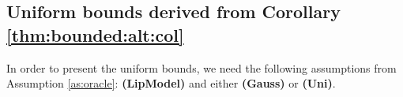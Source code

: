 \documentclass{article}
\newtheorem{assumption}[theorem]{Assumption}
\begin{document}
 \subsection{Uniform bounds derived from Corollary \ref{thm:bounded:alt:col}}
 \label{sec:uniform_bounds}
 In order to present the uniform bounds, we need the following assumptions from Assumption \ref{as:oracle}:
 \textbf{(LipModel)} and either 
\textbf{(Gauss)} or \textbf{(Uni)}.
\end{document}
